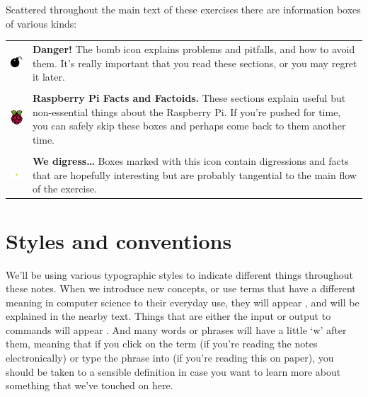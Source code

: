 Scattered throughout the main text of these exercises there are information boxes of various kinds:
\\

\begin{tabular}{m{1.5cm}m{12cm}}
{\includegraphics[width=1.5cm]{images/bomb}} & \textbf{Danger!} The bomb icon explains problems and pitfalls, and how to avoid them. It's really important that you read these sections, or you may regret it later.\\
\\
\includegraphics[width=1.5cm]{images/rpi-logo} & \textbf{Raspberry Pi Facts and Factoids.} These sections explain useful but non-essential things about the Raspberry Pi. If you're pushed for time, you can safely skip these boxes and perhaps come back to them another time.\\
\\
\includegraphics[width=1.5cm]{images/diversion} & \textbf{We digress\ldots} Boxes marked with this icon contain digressions and facts that are hopefully interesting but are probably tangential to the main flow of the exercise.\\
\end{tabular}

\section{Styles and conventions}

We'll be using various typographic styles to indicate different things throughout these notes. When we introduce new concepts, or use terms that have a different meaning in computer science to their everyday use, they will appear , and will be explained in the nearby text. Things that are either the input or output to commands will appear . And many words or phrases will have a little `w' after them, meaning that if you click on the term (if you're reading the notes electronically) or type the phrase into  (if you're reading this on paper), you should be taken to a sensible definition in case you want to learn more about something that we've touched on here. 

